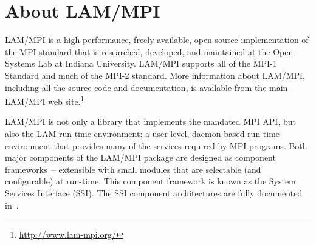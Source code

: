 
\section{About LAM/MPI}

LAM/MPI is a high-performance, freely available, open source
implementation of the MPI standard that is researched, developed, and
maintained at the Open Systems Lab at Indiana University.  LAM/MPI
supports all of the MPI-1 Standard and much of the MPI-2 standard.
More information about LAM/MPI, including all the source code and
documentation, is available from the main LAM/MPI web
site.\footnote{\url{http://www.lam-mpi.org/}}

LAM/MPI is not only a library that implements the mandated MPI API,
but also the LAM run-time environment: a user-level, daemon-based
run-time environment that provides many of the services required by
MPI programs.  Both major components of the LAM/MPI package are
designed as component frameworks~-- extensible with small modules that
are selectable (and configurable) at run-time.  This component
framework is known as the System Services Interface (SSI).  The SSI
component architectures are fully documented
in~\cite{sankaran03:_check_restar_suppor_system_servic,squyres03:_boot_system_servic_inter_ssi,squyres03:_mpi_collec_operat_system_servic,squyres03:_reques_progr_inter_rpi_system,squyres03:_system_servic_inter_ssi_lam_mpi,lamteam03:_lam_mpi_install_guide,lamteam03:_lam_mpi_user_guide}.



